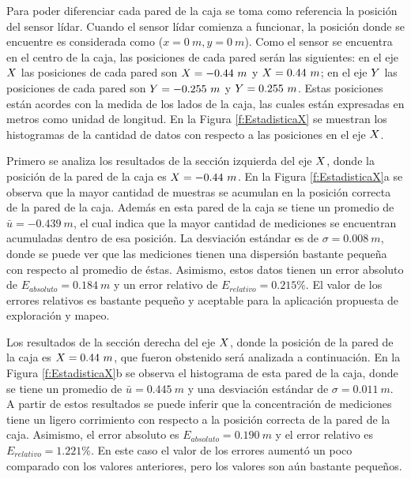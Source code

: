 Para poder diferenciar cada pared de la caja se toma como referencia la posición 
del sensor lídar. Cuando el sensor lídar comienza a funcionar, la posición donde
se encuentre es considerada como ($x = 0~m, y = 0~m$). Como el sensor
se encuentra en el centro de la caja, las posiciones de cada pared serán las 
siguientes: en el eje $\mathnormal X$ las posiciones de cada pared son $\mathnormal X = -0.44~m$ 
y $\mathnormal X = 0.44~m$; en el eje $\mathnormal Y$ las posiciones de cada pared son 
$\mathnormal Y = -0.255~m$ y $\mathnormal Y = 0.255~m$. Estas posiciones están acordes con la medida
de los lados de la caja, las cuales están expresadas en metros como unidad 
de longitud. En la Figura \ref{f:EstadisticaX} se muestran los histogramas de 
la cantidad de datos con respecto a las posiciones en el eje $\mathnormal X$.

Primero se analiza los resultados de la sección izquierda del eje $\mathnormal X$, donde 
la posición de la pared de la caja es $\mathnormal X = -0.44~m$. En la Figura 
\ref{f:EstadisticaX}a se observa que la mayor cantidad de muestras se acumulan en 
la posición correcta de la pared de la caja. Además en esta pared de la caja se 
tiene un promedio de $\bar{u} = -0.439~m$, el cual indica que la mayor cantidad de 
mediciones se encuentran acumuladas dentro de esa posición. La desviación estándar 
es de $\sigma = 0.008~m$, donde se puede ver que las mediciones tienen una dispersión 
bastante pequeña con respecto al promedio de éstas. Asimismo, estos datos tienen un 
error absoluto de $E_{absoluto} = 0.184~m$ y un error relativo de $E_{relativo} = 
0.215\%$. El valor de los errores relativos es bastante pequeño y aceptable para la 
aplicación propuesta de exploración y mapeo.

Los resultados de la sección derecha del eje $\mathnormal X$, donde la posición de la
pared de la caja es $\mathnormal X = 0.44~m$, que fueron obstenido será analizada a 
continuación. En la Figura \ref{f:EstadisticaX}b se observa el histograma de esta 
pared de la caja, donde se tiene un promedio de $\bar{u} = 0.445~m$ y una desviación 
estándar de $\sigma = 0.011~m$. A partir de estos resultados se puede inferir que 
la concentración de mediciones tiene un ligero corrimiento con respecto a la 
posición correcta de la pared de la caja. Asimismo, el error absoluto es 
$E_{absoluto} = 0.190~m$ y el error relativo es $E_{relativo} = 1.221\%$. En este 
caso el valor de los errores aumentó un poco comparado con los valores anteriores, pero 
los valores son aún bastante pequeños.


